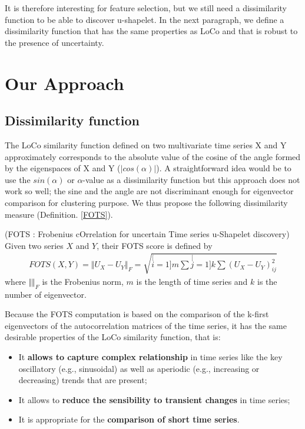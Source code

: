 It is therefore interesting for feature selection, but we still need a dissimilarity
function to be able to discover u-shapelet. In the next paragraph, we 
define a dissimilarity function that has the same properties as LoCo and that is
robust to the presence of uncertainty.





\section{Our Approach}
\subsection{Dissimilarity function}

The LoCo similarity function defined on two multivariate time series X and Y approximately corresponds  to the absolute value of the cosine of the angle formed by the eigenspaces of X and Y ($|cos(\alpha)|$). A straightforward idea would be to use the $sin(\alpha)$ or $\alpha$-value as a dissimilarity function but this approach does not work so well; the sine and the angle are not discriminant enough for eigenvector comparison for clustering purpose. We thus propose the following dissimilarity measure (Definition. \ref{FOTS}). 


\begin{definition}
\label{FOTS}
(FOTS : Frobenius cOrrelation for uncertain Time series u-Shapelet discovery) Given two series $X$
and $Y$, their FOTS score is defined by
\begin{eqnarray}
FOTS(X,Y)=\Vert U_{X}-U_{Y}\Vert_{F}
=\sqrt{\stackrel[i=1]{m}{\sum}\stackrel[j=1]{k}{\sum}(U_{X}-U_{Y})_{ij}^{2}}
\end{eqnarray}
where $\Vert\Vert_{F}$ is the Frobenius norm, $m$ is the length of time series and $k$ is the number of eigenvector.
\end{definition}
 
 Because the FOTS computation is based on the comparison of the k-first eigenvectors of the autocorrelation
 matrices of the time series, it has the same desirable properties of the LoCo
 similarity function, that is: 
 
 \begin{itemize}
   \item It \textbf{allows to capture complex relationship}
in time series like the key oscillatory (e.g., sinusoidal) as well as aperiodic (e.g.,
increasing or decreasing) trends that are present;
   \item It allows to \textbf{reduce the sensibility to transient changes} in time
   series;
   \item It is appropriate for the \textbf{comparison of short
   time series}.
 \end{itemize}

